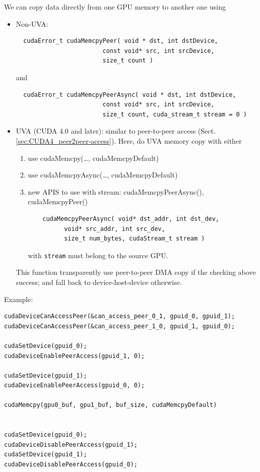 We can copy data directly from one GPU memory to another one using
\begin{itemize}
  \item Non-UVA:
  \begin{lstlisting}
  cudaError_t cudaMemcpyPeer( void * dst, int dstDevice,
                        const void* src, int srcDevice,
                        size_t count )
  \end{lstlisting}
  and
  \begin{lstlisting}
  cudaError_t cudaMemcpyPeerAsync( void * dst, int dstDevice,
                        const void* src, int srcDevice,
                        size_t count, cuda_stream_t stream = 0 )
  \end{lstlisting}
  
  \item UVA (CUDA 4.0 and later): similar to peer-to-peer access
  (Sect.\ref{sec:CUDA4_peer2peer-access}). Here, do UVA memory copy with either
  \begin{enumerate}
    \item use cudaMemcpy(\ldots, cudaMemcpyDefault)
    \item use cudaMemcpyAsync(\ldots, cudaMemcpyDefault)
    \item new APIS to use with stream: cudaMemcpyPeerAsync(), cudaMemcpyPeer()
    \begin{lstlisting}
    cudaMemcpyPeerAsync( void* dst_addr, int dst_dev, 
          void* src_addr, int src_dev, 
          size_t num_bytes, cudaStream_t stream )
    \end{lstlisting}
    with \verb!stream! must belong to the source GPU. 
  \end{enumerate}
 This function transparently use peer-to-peer DMA copy if the checking above success; and fall back to device-host-device otherwise.
  
\end{itemize}

Example:
\begin{lstlisting}
cudaDeviceCanAccessPeer(&can_access_peer_0_1, gpuid_0, gpuid_1);
cudaDeviceCanAccessPeer(&can_access_peer_1_0, gpuid_1, gpuid_0);

cudaSetDevice(gpuid_0);
cudaDeviceEnablePeerAccess(gpuid_1, 0);

cudaSetDevice(gpuid_1);
cudaDeviceEnablePeerAccess(gpuid_0, 0);

cudaMemcpy(gpu0_buf, gpu1_buf, buf_size, cudaMemcpyDefault)


cudaSetDevice(gpuid_0);
cudaDeviceDisablePeerAccess(gpuid_1);
cudaSetDevice(gpuid_1);
cudaDeviceDisablePeerAccess(gpuid_0);
\end{lstlisting}


